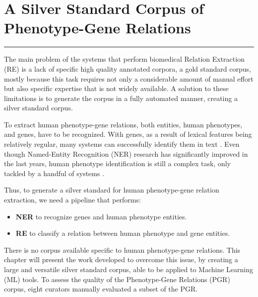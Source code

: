 \hypertarget{3}{}

\chapter{A Silver Standard Corpus of Phenotype-Gene Relations}


\vspace{-1.6cm}

\begingroup
\color{gray}
\par\noindent\rule{\textwidth}{0.4pt}
\endgroup

The main problem of the systems that perform biomedical Relation Extraction (RE) is a lack of specific high quality annotated corpora, a gold standard corpus, mostly because this task requires not only a considerable amount of manual effort but also specific expertise that is not widely available. A solution to these limitations is to generate the corpus in a fully automated manner, creating a silver standard corpus.

To extract human phenotype-gene relations, both entities, human phenotypes, and genes, have to be recognized. With genes, as a result of lexical features being relatively regular, many systems can successfully identify them in text \citep{BANNER}. Even though Named-Entity Recognition (NER) research has significantly improved in the last years, human phenotype identification is still a complex task, only tackled by a handful of systems \citep{IHP}.

Thus, to generate a silver standard for human phenotype-gene relation extraction, we need a pipeline that performs: 

\begin{itemize}
\item{\textbf{NER} to recognize genes and human phenotype entities.} 
\item{\textbf{RE} to classify a relation between human phenotype and gene entities.}
\end{itemize}

There is no corpus available specific to human phenotype-gene relations. This chapter will present the work developed to overcome this issue, by creating a large and versatile silver standard corpus, able to be applied to Machine Learning (ML) tools. To assess the quality of the Phenotype-Gene Relations (PGR) corpus, eight curators manually evaluated a subset of the PGR.

